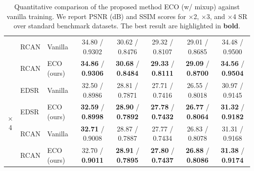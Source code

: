 \documentclass[letterpaper]{article} %
\begin{document}
\begin{table}[!t]
\begin{center}
{\begin{tabular}{c|l|c|c|c|c|c|c}
& RCAN \cite{SISR4_RCAN} & \multicolumn{1}{l|}{Vanilla}    & 34.80 / 0.9302 & 30.62 / 0.8476 & 29.32 / 0.8107 & 29.01 / 0.8685 & 34.48 / 0.9500 \\
& RCAN \cite{SISR4_RCAN} & \multicolumn{1}{l|}{ECO (ours)} & \textbf{34.86} / \textbf{0.9306} & \textbf{30.68} / \textbf{0.8484} & \textbf{29.33} / \textbf{0.8111} & \textbf{29.09} / \textbf{0.8700} & \textbf{34.56} / \textbf{0.9504} \\
%
%
\hline
\hline
\multirow{4}{*}{$\times$4}
& EDSR \cite{SISR2_EDSR} & \multicolumn{1}{l|}{Vanilla}    & 32.50 / 0.8986 & 28.81 / 0.7871 & 27.71 / 0.7416 & 26.55 / 0.8018 & 30.97 / 0.9145 \\
& EDSR \cite{SISR2_EDSR} & \multicolumn{1}{l|}{ECO (ours)} & \textbf{32.59} / \textbf{0.8998} & \textbf{28.90} / \textbf{0.7892} & \textbf{27.78} / \textbf{0.7432} & \textbf{26.77} / \textbf{0.8064} & \textbf{31.32} / \textbf{0.9182} \\
\cline{2-8}
& RCAN \cite{SISR4_RCAN} & \multicolumn{1}{l|}{Vanilla}    & \textbf{32.71} / 0.9008 & 28.87 / 0.7887 & 27.77 / 0.7434 & 26.83 / 0.8078 & 31.31 / 0.9168 \\
& RCAN \cite{SISR4_RCAN} & \multicolumn{1}{l|}{ECO (ours)} & 32.70 / \textbf{0.9011} & \textbf{28.91} / \textbf{0.7895} & \textbf{27.80} / \textbf{0.7437} & \textbf{26.88} / \textbf{0.8086} & \textbf{31.38} / \textbf{0.9174} \\
\hline
\hline
\end{tabular}
}
\caption{Quantitative comparison of the proposed method ECO (w/ mixup) against vanilla training. We report PSNR (dB) and SSIM scores for $\times$2, $\times$3, and $\times$4 SR over standard benchmark datasets. The best result are highlighted in \textbf{bold}.}
\label{tab:maintable}
\end{center}
\end{table}
\end{document}
